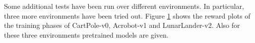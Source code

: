 \documentclass[12pt,a4paper]{article}
\begin{document}
\begin{figure}[H]
    \label{fig:AdditionalEnvironments}

\end{figure}

Some additional tests have been run over different environments. In particular, three more environments have been tried out. Figure \ref{fig:AdditionalEnvironments} shows the reward plots of the training phases of CartPole-v0, Acrobot-v1 and LunarLander-v2. Also for these three environments pretrained models are given.
\end{document}
